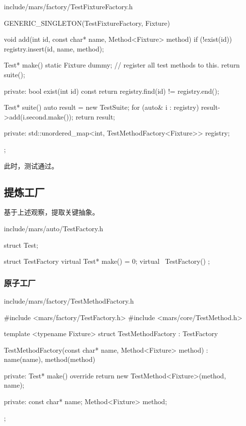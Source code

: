 \begin{content}
\begin{nodiff}{include/mars/factory/TestFixtureFactory.h}
\begin{c++}
GENERIC_SINGLETON(TestFixtureFactory, Fixture) {
  void add(int id, const char* name, Method<Fixture> method) {
    if (!exist(id)) {
      registry.insert({id, {name, method}});
    }
  }

  Test* make() {
    static Fixture dummy; // register all test methods to this.
    return suite();
  }

private:
  bool exist(int id) const {
    return registry.find(id) != registry.end();
  }

  Test* suite() {
    auto result = new TestSuite;
    for (auto& i : registry) {
      result->add(i.second.make());
    }
    return result;
  }

private:
  std::unordered_map<int, TestMethodFactory<Fixture>> registry;
};
 \end{c++}
\end{nodiff}

此时，测试通过。

\subsection{提炼工厂}

基于上述观察，提取关键抽象。

\begin{nodiff}{include/mars/auto/TestFactory.h}
 \begin{c++}
struct Test;

struct TestFactory {
  virtual Test* make() = 0;
  virtual ~TestFactory() {}
};
 \end{c++}
\end{nodiff}

\subsubsection{原子工厂}

\begin{nodiff}{include/mars/factory/TestMethodFactory.h}
 \begin{c++}
#include <mars/factory/TestFactory.h>
#include <mars/core/TestMethod.h>

template <typename Fixture>
struct TestMethodFactory : TestFactory {
  TestMethodFactory(const char* name, Method<Fixture> method)
    : name(name), method(method) {}

private:
  Test* make() override {
    return new TestMethod<Fixture>(method, name);
  }

private:
  const char* name;
  Method<Fixture> method;
};
 \end{c++}
\end{nodiff}


\end{content}

